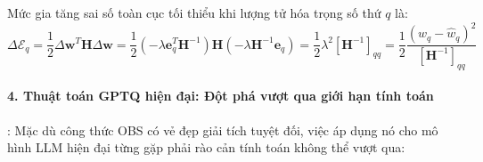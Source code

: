 Mức gia tăng sai số toàn cục tối thiểu khi lượng tử hóa trọng số thứ $q$ là:
\begin{equation}
\Delta \mathcal{E}_q = \frac{1}{2} \Delta \mathbf{w}^T \mathbf{H} \Delta \mathbf{w} = \frac{1}{2} \left(-\lambda \mathbf{e}_q^T \mathbf{H}^{-1}\right) \mathbf{H} \left(-\lambda \mathbf{H}^{-1} \mathbf{e}_q\right) = \frac{1}{2} \lambda^2 [\mathbf{H}^{-1}]_{qq} = \frac{1}{2} \frac{(w_q - \hat{w}_q)^2}{[\mathbf{H}^{-1}]_{qq}}
\end{equation}

\paragraph{4. Thuật toán GPTQ hiện đại: Đột phá vượt qua giới hạn tính toán}:
Mặc dù công thức OBS có vẻ đẹp giải tích tuyệt đối, việc áp dụng nó cho mô hình LLM hiện đại từng gặp phải rào cản tính toán không thể vượt qua:
